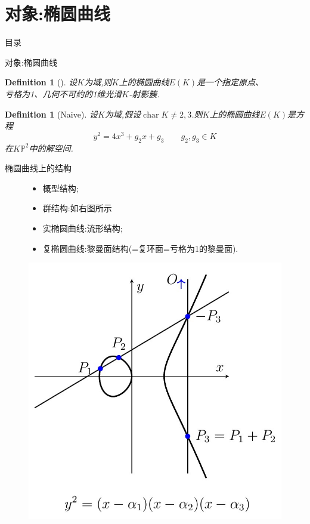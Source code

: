 \documentclass[pdf]{beamer}
\numberwithin{equation}{section}
\theoremstyle{plain}
\newtheorem{defn}[theorem]{Definition}
\theoremstyle{plain}
\theoremstyle{plain}
\theoremstyle{remark}
\DeclareMathOperator{\cha}{\operatorname{char}}
\begin{document}
\section{对象:椭圆曲线}
\begin{frame}{目录}
\tableofcontents[currentsection]
\end{frame}
\begin{frame}{对象:椭圆曲线}
\begin{defn}[]	
	\hspace*{20pt}设$K$为域,则$K$上的椭圆曲线$E(K)$是一个指定原点、\\亏格为1、几何不可约的1维光滑$K$-射影簇.
\end{defn}
\begin{defn}[Naive]	
	\hspace*{20pt}设$K$为域,假设$\cha K \neq 2,3$.则$K$上的椭圆曲线$E(K)$是方程
	$$y^2=4x^3+g_2x+g_3\qquad g_2,g_3 \in K$$
	在$K\mathbb{P}^2$中的解空间.
\end{defn}
\end{frame}
\begin{frame}[fragile]{椭圆曲线上的结构}

	\begin{figure}[th]
	\begin{minipage}[b]{0.48\textwidth}
		\centering
		\begin{itemize}
			\item 概型结构;
			\item 群结构:如右图所示
			\item 实椭圆曲线:流形结构;
			\item 复椭圆曲线:黎曼面结构(=复环面=亏格为1的黎曼面).
		\end{itemize}	
	\end{minipage}
	\begin{minipage}[b]{0.48\textwidth}
		\centering
		\includegraphics[width=.8\textwidth]{ellip1.jpg}
		\label{fig1}
	\end{minipage}
\end{figure}

\end{frame}
\end{document}
